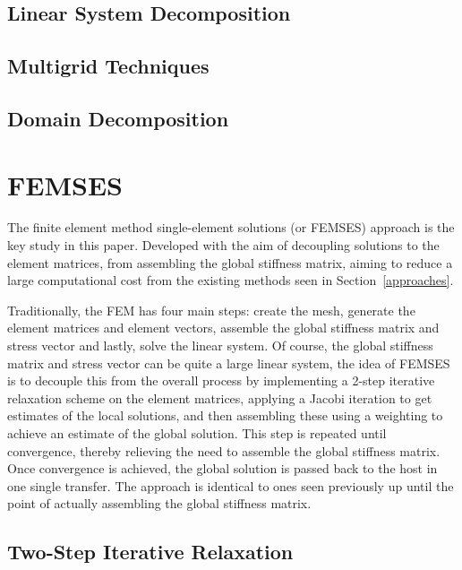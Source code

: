 \subsection{Linear System Decomposition}

\subsection{Multigrid Techniques}

\subsection{Domain Decomposition}

\section{FEMSES}

The finite element method single-element solutions (or FEMSES) approach is the key study in this paper. Developed with the aim of decoupling solutions to the element matrices, from assembling the global stiffness matrix, aiming to reduce a large computational cost from the existing methods seen in Section~\ref{approaches}.

Traditionally, the FEM has four main steps: create the mesh, generate the element matrices and element vectors, assemble the global stiffness matrix and stress vector and lastly, solve the linear system. Of course, the global stiffness matrix and stress vector can be quite a large linear system, the idea of FEMSES is to decouple this from the overall process by implementing a 2-step iterative relaxation scheme on the element matrices, applying a Jacobi iteration to get estimates of the local solutions, and then assembling these using a weighting to achieve an estimate of the global solution. This step is repeated until convergence, thereby relieving the need to assemble the global stiffness matrix. Once convergence is achieved, the global solution is passed back to the host in one single transfer. The approach is identical to ones seen previously up until the point of actually assembling the global stiffness matrix.

\subsection{Two-Step Iterative Relaxation}


